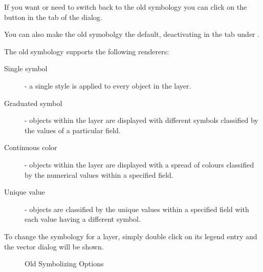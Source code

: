 If you want or need to switch back to the old symbology you can click on the 
 button in the  tab of the  dialog. 

You can also make the old symobolgy the default, deactivating  in the  tab 
under  \arrow {}.

The old \qg symbology supports the following renderers:

\begin{description}
    \item[Single symbol] - a single style is applied to every
    object in the layer.
    \item[Graduated symbol] - objects within the layer are
    displayed with different symbols classified by the values of a
    particular field.
    \item[Continuous color] - objects within the layer are
    displayed with a spread of colours classified by the numerical
    values within a specified field.
    \item[Unique value] - objects are classified by the unique
    values within a specified field with each value having a
    different symbol.
\end{description}

To change the symbology for a layer, simply double click on its legend
entry and the vector  dialog will be
shown.

\begin{figure}[ht]
\centering
\caption{Old Symbolizing Options \nixcaption}
   \hspace{1cm}
   \hspace{1cm}
   \hspace{1cm}
\end{figure}

